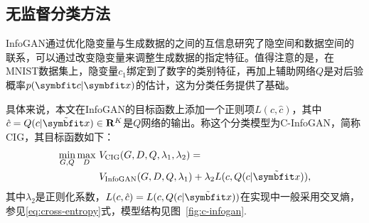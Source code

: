 \subsection{无监督分类方法}
InfoGAN通过优化隐变量与生成数据的之间的互信息研究了隐空间和数据空间的联系，可以通过改变隐变量来调整生成数据的指定特征。值得注意的是，在MNIST数据集上，隐变量$c_1$绑定到了数字的类别特征，再加上辅助网络$Q$是对后验概率$p(\bd{c}|\bd{x})$的估计，这为分类任务提供了基础。

具体来说，本文在InfoGAN的目标函数上添加一个正则项$L(c,\hat{c})$，其中$\hat{c} = Q(c|\tilde{\bd{x}}) \in \reals^K$是$Q$网络的输出。称这个分类模型为C-InfoGAN，简称CIG，其目标函数如下：
\begin{equation}
  \begin{split}
    \min_{G,Q}\max_D~ &V_{\text{CIG}}(G,D,Q,\lambda_1, \lambda_2) = \\
    &V_{\text{InfoGAN}}(G,D,Q,\lambda_1) + \lambda_2 L(c, Q(c|\tilde{\bd{x}})),
  \end{split}
\end{equation}
其中$\lambda_2$是正则化系数，$L(c,\hat{c}) = L(c, Q(c|\tilde{\bd{x}}))$在实现中一般采用交叉熵，参见\eqref{eq:cross-entropy}式，模型结构见图~\ref{fig:c-infogan}.


